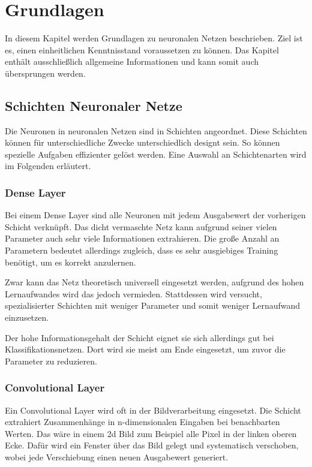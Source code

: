 
\chapter{Grundlagen}

In diesem Kapitel werden Grundlagen zu neuronalen Netzen beschrieben.
Ziel ist es, einen einheitlichen Kenntnisstand voraussetzen zu können.
Das Kapitel enthält ausschließlich allgemeine Informationen und kann somit auch übersprungen werden.

\section{Schichten Neuronaler Netze}
Die Neuronen in neuronalen Netzen sind in Schichten angeordnet.
Diese Schichten können für unterschiedliche Zwecke unterschiedlich designt sein.
So können spezielle Aufgaben effizienter gelöst werden.
Eine Auswahl an Schichtenarten wird im Folgenden erläutert.

\subsection{Dense Layer}
Bei einem Dense Layer sind alle Neuronen mit jedem Ausgabewert der vorherigen Schicht verknüpft.
Das dicht vermaschte Netz kann aufgrund seiner vielen Parameter auch sehr viele Informationen extrahieren.
Die große Anzahl an Parametern bedeutet allerdings zugleich, dass es sehr ausgiebiges Training benötigt, um es korrekt anzulernen.
\newline

Zwar kann das Netz theoretisch universell eingesetzt werden, aufgrund des hohen Lernaufwandes wird das jedoch vermieden.
Stattdessen wird versucht, spezialisierter Schichten mit weniger Parameter und somit weniger Lernaufwand einzusetzen.
\newline

Der hohe Informationsgehalt der Schicht eignet sie sich allerdings gut bei Klassifikationsnetzen.
Dort wird sie meist am Ende eingesetzt, um zuvor die Parameter zu reduzieren.

\subsection{Convolutional Layer}
Ein Convolutional Layer wird oft in der Bildverarbeitung eingesetzt.
Die Schicht extrahiert Zusammenhänge in n-dimensionalen Eingaben bei benachbarten Werten.
Das wäre in einem 2d Bild zum Beispiel alle Pixel in der linken oberen Ecke.
Dafür wird ein Fenster über das Bild gelegt und systematisch verschoben, wobei jede Verschiebung einen neuen Ausgabewert generiert.
\newline

